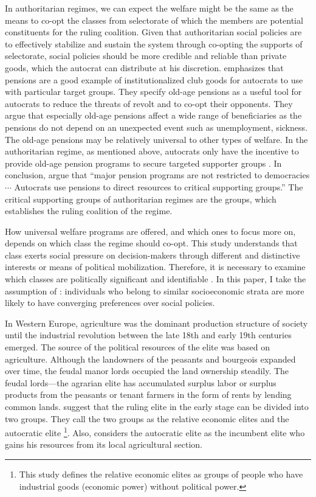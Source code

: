 \documentclass[11pt]{article}
\begin{document}
In authoritarian regimes, we can expect the welfare might be the same as the means to co-opt the classes from selectorate of which the members are potential constituents for the ruling coalition. Given that authoritarian social policies are to effectively stabilize and sustain the system through co-opting the supports of selectorate, social policies should be more credible and reliable than private goods, which the autocrat can distribute at his discretion. \citet{Knutsen2018} emphasizes that pensions are a good example of institutionalized club goods for autocrats to use with particular target groups. They specify old-age pensions as a useful tool for autocrats to reduce the threats of revolt and to co-opt their opponents. They argue that especially old-age pensions affect a wide range of beneficiaries as the pensions do not depend on an unexpected event such as unemployment, sickness. The old-age pensions may be relatively universal to other types of welfare. In the authoritarian regime, as mentioned above, autocrats only have the incentive to provide old-age pension programs to secure targeted supporter groups \citep[670]{Knutsen2018}. In conclusion, \citet[688]{Knutsen2018} argue that ``major pension programs are not restricted to democracies $\cdots$ Autocrats use pensions to direct resources to critical supporting groups.'' The critical supporting groups of authoritarian regimes are the groups, which establishes the ruling coalition of the regime.

How universal welfare programs are offered, and which ones to focus more on, depends on which class the regime should co-opt. This study understands that class exerts social pressure on decision-makers through different and distinctive interests or means of political mobilization. Therefore, it is necessary to examine which classes are politically significant and identifiable \citep{Bean1998}. In this paper, I take the assumption of \citet[1495]{Dahlum2019}: individuals who belong to similar socioeconomic strata are more likely to have converging preferences over social policies.

In Western Europe, agriculture was the dominant production structure of society until the industrial revolution between the late 18th and early 19th centuries emerged. The source of the political resources of the elite was based on agriculture. Although the landowners of the peasants and bourgeois expanded over time, the feudal manor lords occupied the land ownership steadily. The feudal lords---the agrarian elite has accumulated surplus labor or surplus products from the peasants or tenant farmers in the form of rents by lending common lands. \citet{Ansell2015a} suggest that the ruling elite in the early stage can be divided into two groups. They call the two groups as the relative economic elites and the autocratic elite \footnote{This study defines the relative economic elites as groups of people who have industrial goods (economic power) without political power.}. Also, \citet{Ansell2015a} considers the autocratic elite as the incumbent elite who gains his resources from its local agricultural section.
\end{document}
